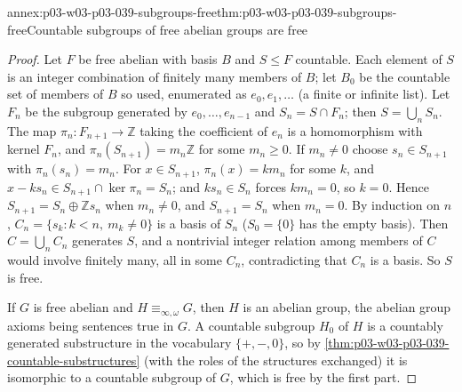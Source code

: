 \begin{annexitem}{annex:p03-w03-p03-039-subgroups-free}{thm:p03-w03-p03-039-subgroups-free}{Countable subgroups of free abelian groups are free}
\begin{proof}
Let \(F\) be free abelian with basis \(B\) and \(S\le F\) countable. Each
element of \(S\) is an integer combination of finitely many members of \(B\);
let \(B_0\) be the countable set of members of \(B\) so used, enumerated as
\(e_0,e_1,\ldots\) (a finite or infinite list). Let \(F_n\) be the subgroup
generated by \(e_0,\dots,e_{n-1}\) and \(S_n=S\cap F_n\); then
\(S=\bigcup_nS_n\). The map \(\pi_n:F_{n+1}\to\mathbb Z\) taking the
coefficient of \(e_n\) is a homomorphism with kernel \(F_n\), and
\(\pi_n(S_{n+1})=m_n\mathbb Z\) for some \(m_n\ge0\). If \(m_n\ne0\) choose
\(s_n\in S_{n+1}\) with \(\pi_n(s_n)=m_n\). For \(x\in S_{n+1}\),
\(\pi_n(x)=km_n\) for some \(k\), and \(x-ks_n\in S_{n+1}\cap\ker\pi_n=S_n\);
and \(ks_n\in S_n\) forces \(km_n=0\), so \(k=0\). Hence \(S_{n+1}=S_n\oplus\mathbb Zs_n\)
when \(m_n\ne0\), and \(S_{n+1}=S_n\) when \(m_n=0\). By induction on \(n\),
\(C_n=\{s_k:k<n,\ m_k\ne0\}\) is a basis of \(S_n\) (\(S_0=\{0\}\) has the
empty basis). Then \(C=\bigcup_nC_n\) generates \(S\), and a nontrivial
integer relation among members of \(C\) would involve finitely many, all in
some \(C_n\), contradicting that \(C_n\) is a basis. So \(S\) is free.

If \(G\) is free abelian and \(H\equiv_{\infty,\omega}G\), then \(H\) is an
abelian group, the abelian group axioms being sentences true in \(G\). A
countable subgroup \(H_0\) of \(H\) is a countably generated substructure in
the vocabulary \(\{+,-,0\}\), so by
\cref{thm:p03-w03-p03-039-countable-substructures} (with the roles of the
structures exchanged) it is isomorphic to a countable subgroup of \(G\),
which is free by the first part.
\end{proof}
\end{annexitem}

